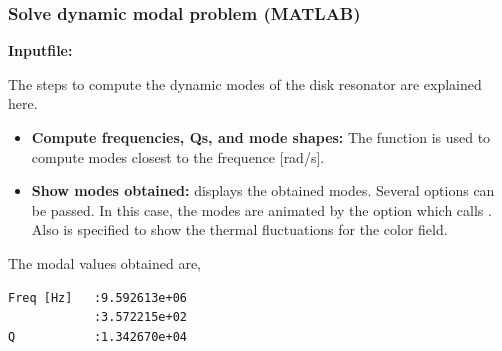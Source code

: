 \clearpage
\subsubsection*{Solve dynamic modal problem (MATLAB)}
\begin{flushleft}
  \textbf{Inputfile:}
  \\
\end{flushleft}
\hspace{1in}
{\footnotesize
{}
}

\clearpage
The steps to compute the dynamic modes of the disk resonator are 
explained here. 

\begin{itemize}

  \item{\textbf{Compute frequencies, Qs, and mode shapes:}}
  The function  is used to compute 
  modes closest to the frequence [rad/s]. 

  \item{\textbf{Show modes obtained:}}
   displays the obtained modes. Several options
  can be passed. In this case, the modes are animated by
  the  option which calls . 
  Also  is specified to show the thermal fluctuations
  for the color field.

\end{itemize}

The modal values obtained are,
\begin{verbatim}
Freq [Hz]   :9.592613e+06
            :3.572215e+02
Q           :1.342670e+04
\end{verbatim}

